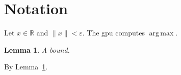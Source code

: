 \documentclass{article}
\newcommand{\R}{\mathbb{R}}
\newcommand{\norm}[1]{\lVert #1 \rVert}
\DeclareMathOperator{\argmax}{arg\,max}
\def\eps{\varepsilon}
\newtheorem{lemma}{Lemma}
\begin{document}
\section{Notation}
\label{sec:notation}
Let $x \in \R$ and $\norm{x} < \eps$. The \gls{gpu} computes $\argmax$.
\begin{lemma}\label{lem:bound}
A bound.
\end{lemma}
By Lemma~\ref{lem:bound}.
\end{document}
